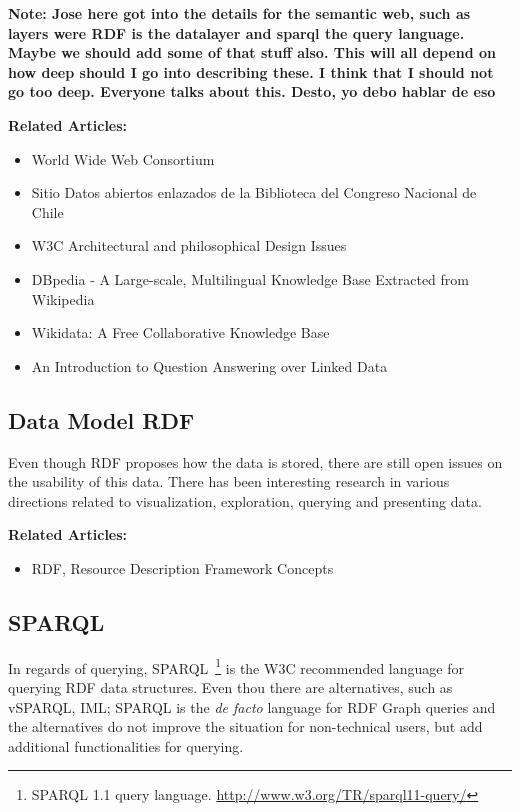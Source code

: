 \textbf{Note: Jose here got into the details for the semantic web, such as layers were RDF is the datalayer and sparql the query language. Maybe we should add some of that stuff also. This will all depend on how deep should I go into describing these. I think that I should not go too deep. Everyone talks about this. Desto, yo debo hablar de eso}

\textbf{Related Articles:}
\begin{itemize}
    \item World Wide Web Consortium \cite{w3c}
    \item Sitio Datos abiertos enlazados de la Biblioteca del Congreso Nacional de Chile \cite{datosbcn}
    \item W3C Architectural and philosophical Design Issues \cite{W3CDesignIssues}
    \item DBpedia - A Large-scale, Multilingual Knowledge Base Extracted from Wikipedia\cite{Lehmann2014}
    \item Wikidata: A Free Collaborative Knowledge Base \cite{Wikidata2014}
    \item An Introduction to Question Answering over Linked Data\cite{Unger2014}
\end{itemize}

\subsection{Data Model RDF}

Even though RDF proposes how the data is stored, there are still open issues on the usability of this data. There has been interesting research in various directions related to visualization, exploration, querying and presenting data.

\textbf{Related Articles:}
\begin{itemize}
    \item RDF, Resource Description Framework Concepts \cite{rdfConcepts}
\end{itemize}

\subsection{SPARQL}
\label{chap:SPARQL}

In regards of querying, SPARQL~\footnote{SPARQL 1.1 query language. \url{http://www.w3.org/TR/sparql11-query/}} is the W3C recommended language for querying RDF data structures. Even thou there are alternatives, such as vSPARQL, IML; SPARQL is the \textit{de facto} language for RDF Graph queries and the alternatives do not improve the situation for non-technical users, but add additional functionalities for querying. 

